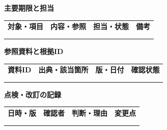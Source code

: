 \documentclass[11pt,a4paper]{article}
\begin{document}
\par{}\noindent\textbf{主要期限と担当}\par\vspace{1mm}
{\fontsize{8.5}{13}\selectfont
\begin{tabularx}{\linewidth}{@{}XXXX@{}}
\textbf{対象・項目} & \textbf{内容・参照} & \textbf{担当・状態} & \textbf{備考}\\[2mm]
\strut & \strut & \strut & \strut\\[5mm]
\strut & \strut & \strut & \strut\\[5mm]
\end{tabularx}
}\vspace{2mm}\par
{}
\par{}\noindent\textbf{参照資料と根拠ID}\par\vspace{1mm}
{\fontsize{8.5}{13}\selectfont
\begin{tabularx}{\linewidth}{@{}XXXX@{}}
\textbf{資料ID} & \textbf{出典・該当箇所} & \textbf{版・日付} & \textbf{確認状態}\\[2mm]
\strut & \strut & \strut & \strut\\[5mm]
\strut & \strut & \strut & \strut\\[5mm]
\end{tabularx}
}\vspace{2mm}\par
{}
\par{}\noindent\textbf{点検・改訂の記録}\par\vspace{1mm}
{\fontsize{8.5}{13}\selectfont
\begin{tabularx}{\linewidth}{@{}XXXX@{}}
\textbf{日時・版} & \textbf{確認者} & \textbf{判断・理由} & \textbf{変更点}\\[2mm]
\strut & \strut & \strut & \strut\\[5mm]
\strut & \strut & \strut & \strut\\[5mm]
\end{tabularx}
}\vspace{2mm}\par
\end{document}
